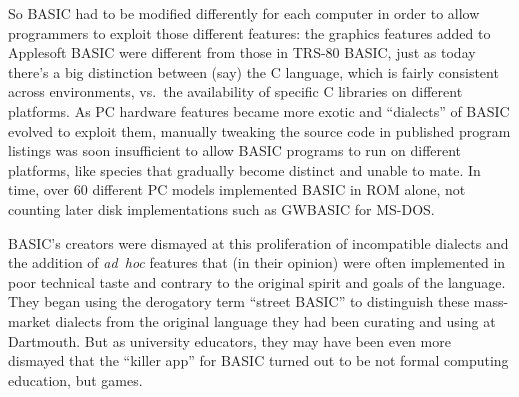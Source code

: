 So BASIC had to be modified differently for each computer in order to
allow programmers to exploit those different features: the graphics
features added to Applesoft BASIC were different from those in TRS-80
BASIC, just as today there's a big distinction between (say)
the C language, which is fairly consistent across environments, vs.\ the
availability of specific C libraries on different platforms.
As PC hardware features became more exotic and ``dialects'' of BASIC
evolved to exploit them, manually tweaking the source code in published program
listings was soon insufficient to allow BASIC programs to run on
different platforms, like species that
gradually become distinct and unable to mate.
In time, over 60
different PC models implemented BASIC in ROM alone, not counting later
disk implementations such as GWBASIC for MS-DOS.

BASIC's creators were dismayed at this proliferation of incompatible
dialects and the addition of \emph{ad~hoc} features that (in their
opinion) were often implemented in poor technical taste and contrary to
the original spirit and goals of the language.
They began using the derogatory term ``street BASIC'' to distinguish
these mass-market dialects from the original language they had been
curating and using at Dartmouth.
But as university educators, they may have been even more dismayed that
the ``killer app'' for BASIC turned out to be not formal computing
education, but games.
